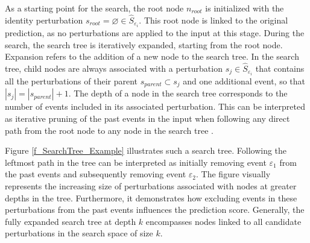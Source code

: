 
As a starting point for the search, the root node $n_{root}$ is initialized with the identity perturbation $s_{root} = \varnothing \in \hat{S}_{\varepsilon_i}$. This root node is linked to the original prediction, as no perturbations are applied to the input at this stage. During the search, the search tree is iteratively expanded, starting from the root node. Expansion refers to the addition of a new node to the search tree. In the search tree, child nodes are always associated with a perturbation $s_j \in \hat{S}_{\varepsilon_i}$ that contains all the perturbations of their parent $s_{parent} \subset s_j$ and one additional event, so that $|s_j| = |s_{parent}| + 1$. The depth of a node in the search tree corresponds to the number of events included in its associated perturbation. This can be interpreted as iterative pruning of the past events in the input when following any direct path from the root node to any node in the search tree \cite{yuan_explainability_2021}.

Figure \ref{f_SearchTree_Example} illustrates such a search tree. Following the leftmost path in the tree can be interpreted as initially removing event $\varepsilon_1$ from the past events and subsequently removing event $\varepsilon_2$. The figure visually represents the increasing size of perturbations associated with nodes at greater depths in the tree. Furthermore, it demonstrates how excluding events in these perturbations from the past events influences the prediction score. Generally, the fully expanded search tree at depth $k$ encompasses nodes linked to all candidate perturbations in the search space of size $k$.


